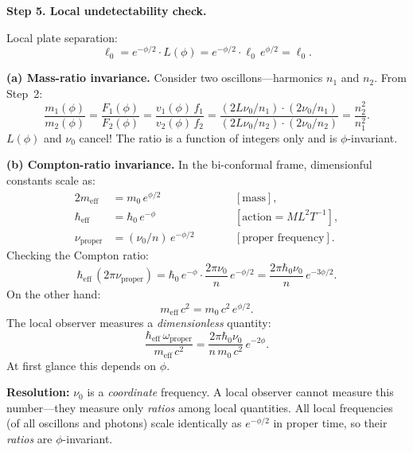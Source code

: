 \documentclass[11pt]{article}
\begin{document}
\bigskip
\textbf{Step 5. Local undetectability check.}

Local plate separation:
\begin{equation}
  \ell_0 = e^{-\phi/2}\cdot L(\phi)
  = e^{-\phi/2}\cdot \ell_0\,e^{\phi/2} = \ell_0.
\end{equation}

\textbf{(a) Mass-ratio invariance.}
Consider two oscillons---harmonics $n_1$ and $n_2$. From Step~2:
\begin{equation}
  \frac{m_1(\phi)}{m_2(\phi)}
  = \frac{F_1(\phi)}{F_2(\phi)}
  = \frac{v_1(\phi)\,f_1}{v_2(\phi)\,f_2}
  = \frac{(2L\nu_0/n_1)\cdot(2\nu_0/n_1)}
         {(2L\nu_0/n_2)\cdot(2\nu_0/n_2)}
  = \frac{n_2^2}{n_1^2}.
  \label{eq:mass_ratio}
\end{equation}
$L(\phi)$ and $\nu_0$ cancel! The ratio is a function of integers
only and is $\phi$-invariant.

\textbf{(b) Compton-ratio invariance.}
In the bi-conformal frame, dimensionful constants scale as:
\begin{alignat}{2}
  m_{\mathrm{eff}} &= m_0\,e^{\phi/2}
    &\qquad& [\text{mass}],\\
  \hbar_{\mathrm{eff}} &= \hbar_0\,e^{-\phi}
    &\qquad& [\text{action} = ML^2T^{-1}],\\
  \nu_{\mathrm{proper}} &= (\nu_0/n)\,e^{-\phi/2}
    &\qquad& [\text{proper frequency}].
\end{alignat}
Checking the Compton ratio:
\begin{equation}
  \hbar_{\mathrm{eff}}\,(2\pi\nu_{\mathrm{proper}})
  = \hbar_0\,e^{-\phi}\cdot
  \frac{2\pi\nu_0}{n}\,e^{-\phi/2}
  = \frac{2\pi\hbar_0\nu_0}{n}\,e^{-3\phi/2}.
\end{equation}
On the other hand:
\begin{equation}
  m_{\mathrm{eff}}\,c^2
  = m_0\,c^2\,e^{\phi/2}.
\end{equation}
The local observer measures a \emph{dimensionless} quantity:
\begin{equation}
  \frac{\hbar_{\mathrm{eff}}\,\omega_{\mathrm{proper}}}
       {m_{\mathrm{eff}}\,c^2}
  = \frac{2\pi\hbar_0\nu_0}{n\,m_0\,c^2}\,
  e^{-2\phi}.
\end{equation}
At first glance this depends on $\phi$.

\textbf{Resolution:} $\nu_0$ is a \emph{coordinate} frequency. A
local observer cannot measure this number---they measure only
\emph{ratios} among local quantities. All local frequencies (of all
oscillons and photons) scale identically as $e^{-\phi/2}$ in proper
time, so their \emph{ratios} are $\phi$-invariant.
\end{document}
